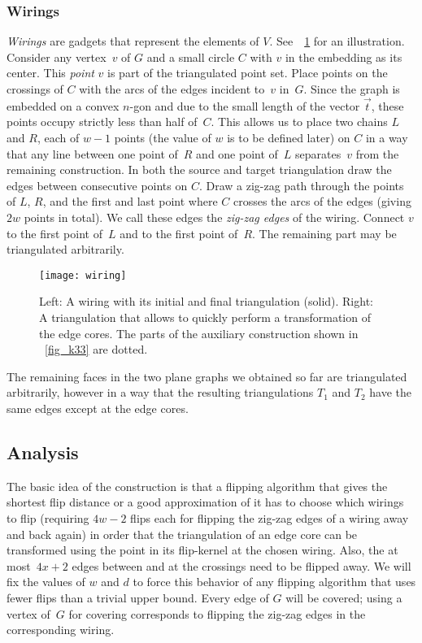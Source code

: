 \documentclass[11pt,a4paper]{article}
\begin{document}
\subsubsection{Wirings}
\emph{Wirings} are gadgets that represent the elements of $V$.
See~\figurename~\ref{fig_wiring} for an illustration.
Consider any vertex~$v$ of $G$ and a small circle $C$ with $v$ in the embedding as its center.
This \emph{point} $v$ is part of the triangulated point set.
Place points on the crossings of $C$ with the arcs of the edges incident to~$v$ in~$G$.
Since the graph is embedded on a convex $n$-gon and due to the small length of the vector $\vec{t}$, these points occupy strictly less than half of~$C$.
This allows us to place two chains $L$ and $R$, each of $w-1$ points (the value of $w$ is to be defined later) on $C$ in a way that any line between one point of~$R$ and one point of~$L$ separates~$v$ from the remaining construction.
In both the source and target triangulation draw the edges between consecutive points on $C$.
Draw a zig-zag path through the points of $L$, $R$, and the first and last point where $C$ crosses the arcs of the edges (giving $2w$ points in total).
We call these edges the \emph{zig-zag edges} of the wiring.
Connect $v$ to the first point of~$L$ and to the first point of~$R$.
The remaining part may be triangulated arbitrarily.

\begin{figure}
\centering
\texttt{[image: wiring]}
\caption{Left: A wiring with its initial and final triangulation (solid).
Right: A triangulation that allows to quickly perform a transformation of the edge cores.
The parts of the auxiliary construction shown in \figurename~\ref{fig_k33} are dotted.
}
\label{fig_wiring}
\end{figure}


The remaining faces in the two plane graphs we obtained so far are triangulated arbitrarily, however in a way that the resulting triangulations $T_1$ and $T_2$ have the same edges except at the edge cores.


\subsection{Analysis}
\newcommand{\opt}{\ensuremath{\mathrm{opt}}}
The basic idea of the construction is that a flipping algorithm that gives the shortest flip distance or a good approximation of it has to choose which wirings to flip (requiring $4w-2$ flips each for flipping the zig-zag edges of a wiring away and back again) in order that the triangulation of an edge core can be transformed using the point in its flip-kernel at the chosen wiring.
Also, the at most~$4x+2$ edges between and at the crossings need to be flipped away.
We will fix the values of $w$ and $d$ to force this behavior of any flipping algorithm that uses fewer flips than a trivial upper bound.
Every edge of $G$ will be covered; using a vertex of~$G$ for covering corresponds to flipping the zig-zag edges in the corresponding wiring.
\end{document}
